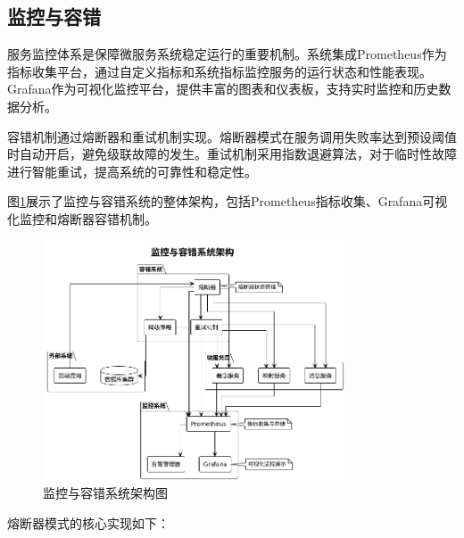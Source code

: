 \subsection{监控与容错}

服务监控体系是保障微服务系统稳定运行的重要机制。系统集成Prometheus作为指标收集平台，通过自定义指标和系统指标监控服务的运行状态和性能表现。Grafana作为可视化监控平台，提供丰富的图表和仪表板，支持实时监控和历史数据分析。

容错机制通过熔断器和重试机制实现。熔断器模式在服务调用失败率达到预设阈值时自动开启，避免级联故障的发生。重试机制采用指数退避算法，对于临时性故障进行智能重试，提高系统的可靠性和稳定性。

图\ref{fig:monitoring_fault_tolerance}展示了监控与容错系统的整体架构，包括Prometheus指标收集、Grafana可视化监控和熔断器容错机制。

\begin{figure}[H]
    \centering
    \includegraphics[width=0.8\textwidth]{chapters/fig-0/monitoring_fault_tolerance.png}
    \caption{监控与容错系统架构图}
    \label{fig:monitoring_fault_tolerance}
\end{figure}

熔断器模式的核心实现如下：

